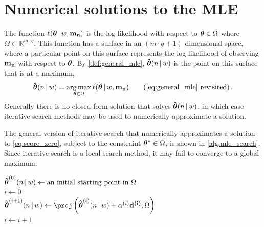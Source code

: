 \documentclass[
    11pt,
    extrafontsizes,
    article,
    oldfontcommands,
    final,
    oneside,
    openany,
    hidelinks]{memoir}
\begin{document}
\chapter{Numerical solutions to the MLE}
\label{appendix:numerical_solution}
The function $\ell(\boldsymbol{\mathbf{\theta}} {\,|\,} w, \boldsymbol{\mathbf{m_n}})$ is the log-likelihood with respect to $\boldsymbol{\mathbf{\theta}} \in \Omega$ where $\Omega \subset \mathbb{R}^{m \cdot q}$. This function has a surface in an $(m \cdot q+1)$ dimensional space, where a particular point on this surface represents the log-likelihood of observing $\boldsymbol{\mathbf{m_n}}$ with respect to $\boldsymbol{\mathbf{\theta}}$. By \cref{def:general_mle}, $\boldsymbol{\mathbf{\hat{\boldsymbol{\mathbf{\theta}}}}}(n {\,|\,} w)$ is the point on this surface that is at a maximum,
\begin{equation*}
    \mle = \argmax_{\sysparamvec \in \Omega} \ell(\sysparamvec \given w, \mfso)
    \tag{\ref{eq:general_mle} revisited}\,.
\end{equation*}
Generally there is no closed-form solution that solves $\boldsymbol{\mathbf{\hat{\boldsymbol{\mathbf{\theta}}}}}(n {\,|\,} w)$, in which case iterative search methods may be used to numerically approximate a solution.

The general version of iterative search that numerically approximates a solution to \cref{eq:score_zero}, subject to the constraint ${\boldsymbol{\mathbf{\theta}}}^{\star} \in \Omega$, is shown in \cref{alg:mle_search}. Since iterative search is a local search method, it may fail to converge to a global maximum.
\begin{algorithm}[h]
\DontPrintSemicolon
{}
\BlankLine
{}
\func{$\findmle${}{$(\mfso)$}}
{
    $\boldsymbol{\mathbf{\hat{\boldsymbol{\mathbf{\theta}}}}}^{(0)}(n {\,|\,} w) \gets \text{an initial starting point in $\Omega$}$\\
    $i \gets 0$\\
    {
        $\mlei{i+1} \gets \proj\left(\mlei{i} + \alpha^{(i)} \vec{d^{(i)}}, \Omega\right)$\\
        $i \gets i + 1$\\
    }
}
\caption{Iterative maximum likelihood search}
\label{alg:mle_search}
\end{algorithm}
\end{document}
